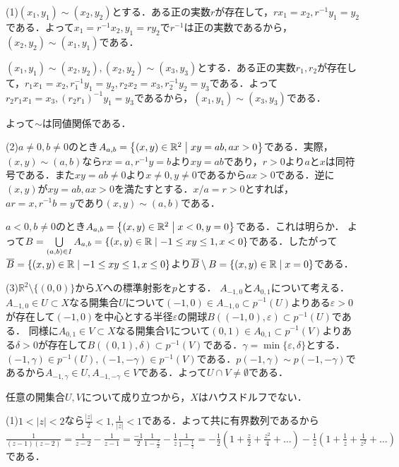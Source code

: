 \documentclass[
		book,
		head_space=20mm,
		foot_space=20mm,
		gutter=10mm,
		line_length=190mm
]{jlreq}
\begin{document}
(1)$(x_1,y_1)\sim (x_2,y_2)$とする．ある正の実数$r$が存在して，$rx_1=x_2,r^{-1}y_1=y_2$である．よって$x_1=r^{-1}x_2,y_1=ry_2$で$r^{-1}$は正の実数であるから，$(x_2,y_2)\sim (x_1,y_1)$である．

$(x_1,y_1)\sim (x_2,y_2),(x_2,y_2)\sim (x_3,y_3)$とする．ある正の実数$r_1,r_2$が存在して，$r_1x_1=x_2,r_1^{-1}y_1=y_2,r_2x_2=x_3,r_2^{-1}y_2=y_3$である．よって$r_2r_1x_1=x_3,(r_2r_1)^{-1}y_1=y_3$であるから，$(x_1,y_1)\sim (x_3,y_3)$である．

よって$\sim$は同値関係である．

(2)$a\neq 0,b\neq 0$のとき$A_{a,b}=\left\{ (x,y)\in \mathbb{R}^2\mathrel{}\middle|\mathrel{} xy=ab,ax>0\right\}$である．実際，$(x,y) \sim (a,b)$なら$rx=a,r^{-1}y=b$より$xy=ab$であり，$r>0$より$a$と$x$は同符号である．また$xy=ab\neq 0$より$x\neq 0,y\neq 0$であるから$ax>0$である．逆に$(x,y)$が$xy=ab,ax>0$を満たすとする．$x/a=r>0$とすれば，$ar=x,r^{-1}b=y$であり$(x,y)\sim (a,b)$である．

$a<0,b\neq 0$のとき$A_{a,b}=\left\{ (x,y)\in \mathbb{R}^2\mathrel{}\middle|\mathrel{} x<0,y=0\right\}$である．これは明らか．
よって$B=\bigcup\limits_{(a,b)\in I} A_{a,b}=\left\{ (x,y)\in \mathbb{R}\mathrel{}\middle|\mathrel{} -1\le xy\le1,x<0\right\}$である．したがって$\overline{B}=\left\{ (x,y)\in \mathbb{R}\mathrel{}\middle|\mathrel{} -1\le xy\le1,x\le 0\right\}$より$\overline{B}\setminus B= \left\{ (x,y)\in \mathbb{R}\mathrel{}\middle|\mathrel{} x=0 \right\}$である．

(3)$\mathbb{R}^2\setminus\{ (0,0)\}$から$X$への標準射影を$p$とする．
$A_{-1,0}$と$A_{0,1}$について考える．$A_{-1,0}\in U\subset X$なる開集合$U$について$(-1,0)\in A_{-1,0}\subset p^{-1}(U)$よりある$\varepsilon>0$が存在して$(-1,0)$を中心とする半径$\varepsilon$の開球$B((-1,0),\varepsilon)\subset p^{-1}(U)$である．
同様に$A_{0,1}\in V\subset X$なる開集合$V$について$(0,1)\in A_{0,1}\subset p^{-1}(V)$よりある$\delta>0$が存在して$B((0,1),\delta)\subset p^{-1}(V)$である．$\gamma=\min\{\varepsilon,\delta\}$とする．
$(-1,\gamma)\in p^{-1}(U),(-1,-\gamma)\in p^{-1}(V)$である．$p(-1,\gamma)\sim p(-1,-\gamma)$であるから$A_{-1,\gamma} \in U,A_{-1,-\gamma}\in V$である．よって$U\cap V\neq \emptyset$である．

任意の開集合$U,V$について成り立つから，$X$はハウスドルフでない．

(1)$1<|z|<2$なら$\frac{|z|}{2}<1,\frac{1}{|z|}<1$である．よって共に有界数列であるから
$\frac{1}{(z-1)(z-2)}=\frac{1}{z-2}-\frac{1}{z-1}=\frac{-1}{2}\frac{1}{1-\frac{z}{2}}-\frac{1}{z}\frac{1}{1-\frac{1}{z}}=-\frac{1}{2}(1+\frac{z}{2}+\frac{z^2}{4}+\dots)-\frac{1}{z}(1+\frac{1}{z}+\frac{1}{z^2}+\dots)$である．
\end{document}
